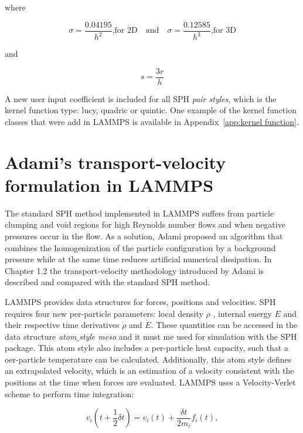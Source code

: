 where

\begin{equation}
 \sigma = \frac{0.04195}{h^2} \text{,for 2D} \quad \text{and} \quad \sigma = \frac{0.12585}{h^3} \text{,for 3D}
\end{equation}

and 

\begin{equation}
 s = \frac{3r}{h}
\end{equation}

A new user input coefficient is included for all SPH \textit{pair styles}, which is the kernel function type: lucy, quadric or quintic. One example of the kernel function classes
that were add in LAMMPS is available in Appendix~\ref{app:kernel function}.

\section{Adami's transport-velocity formulation in LAMMPS}
\label{sec:section 6}


The standard SPH method implemented in LAMMPS suffers from particle clumping and void regions for high Reynolds number flows and when negative pressures occur in the flow.
As a solution, Adami \cite{adami_transport-velocity_2013} proposed an algorithm that combines the homogenization of the particle configuration by a background pressure while at the same
time reduces artificial numerical dissipation. In Chapter 1.2 the transport-velocity methodology introduced by Adami is described and compared with the standard SPH method.\par

LAMMPS provides data structures for forces, positions and velocities. SPH requires four new per-particle parameters: local density $\rho$ , internal energy $E$ and their respective
time derivatives $\dot{\rho}$ and $\dot{E}$. These quantities can be accessed in the data structure \textit{atom$\_$style meso} and it must me used for simulation with the SPH package.
This atom style also includes a per-particle heat capacity, such that a oer-particle temperature can be calculated. Additionally, this atom style defines an extrapolated velocity,
which is an estimation of a velocity consistent with the positions at the time when forces are evaluated. LAMMPS uses a Velocity-Verlet scheme to perform time integration:

\begin{equation}
v_{i}(t+\frac{1}{2}\delta t) = v_{i}(t) + \frac{\delta t}{2m_{i}} f_{i}(t),
\end{equation}

